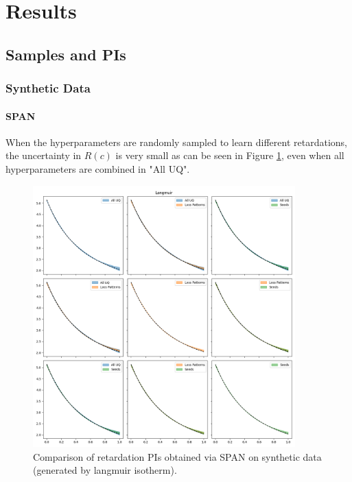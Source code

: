 \documentclass{article}
\begin{document}
\section{Results}
\subsection{Samples and PIs}
\subsubsection{Synthetic Data}

\paragraph{SPAN}
When the hyperparameters are randomly sampled to learn different retardations, the uncertainty in $R(c)$ is very small as can be seen in Figure \ref{fig:synthetic_SPAN_factors_PIs}, even when all hyperparameters are combined in "All UQ".

\begin{figure}
    \centering
    \includegraphics[width=0.9\textwidth]{figs/finn_synthetic_SPAN_factors_PIs.png}
    \caption{Comparison of retardation PIs obtained via SPAN on synthetic data (generated by langmuir isotherm).}
    \label{fig:synthetic_SPAN_factors_PIs}
\end{figure}
\end{document}
